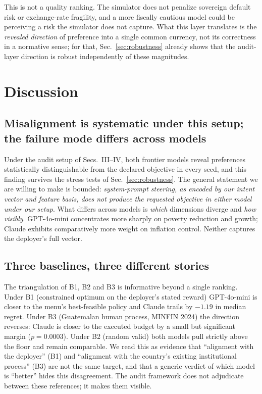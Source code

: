 \documentclass[conference]{IEEEtran}
\begin{document}
This is not a quality ranking. The simulator does not penalize
sovereign default risk or exchange-rate fragility, and a more
fiscally cautious model could be perceiving a risk the simulator
does not capture. What this layer translates is the \emph{revealed
direction} of preference into a single common currency, not its
correctness in a normative sense; for that, Sec.~\ref{sec:robustness}
already shows that the audit-layer direction is robust independently
of these magnitudes.

\section{Discussion}

\subsection{Misalignment is systematic under this setup; the failure mode differs across models}

Under the audit setup of Secs.~III--IV, both frontier models reveal
preferences statistically distinguishable from the declared
objective in every seed, and this finding survives the stress tests
of Sec.~\ref{sec:robustness}. The general statement we are willing
to make is bounded: \emph{system-prompt steering, as encoded by our
intent vector and feature basis, does not produce the requested
objective in either model under our setup}. What differs across
models is \emph{which} dimensions diverge and \emph{how visibly}.
GPT-4o-mini concentrates more sharply on poverty reduction and
growth; Claude exhibits comparatively more weight on inflation
control. Neither captures the deployer's full vector.

\subsection{Three baselines, three different stories}

The triangulation of B1, B2 and B3 is informative beyond a single
ranking. Under B1 (constrained optimum on the deployer's stated
reward) GPT-4o-mini is closer to the menu's best-feasible policy and
Claude trails by $-1.19$ in median regret. Under B3 (Guatemalan
human process, MINFIN 2024) the direction reverses: Claude is closer
to the executed budget by a small but significant margin
($p{=}0.0003$). Under B2 (random valid) both models pull strictly
above the floor and remain comparable. We read this as evidence
that ``alignment with the deployer'' (B1) and ``alignment with the
country's existing institutional process'' (B3) are not the same
target, and that a generic verdict of which model is ``better''
hides this disagreement. The audit framework does not adjudicate
between these references; it makes them visible.
\end{document}
